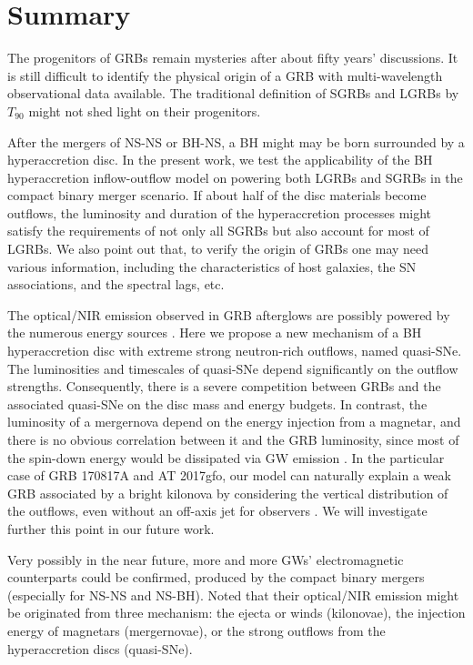 \documentclass[a4paper,fleqn,usenatbib]{mnras}
\begin{document}
\section{Summary}\label{Summary}

The progenitors of GRBs remain mysteries after about fifty years' discussions. It is still difficult to identify the physical origin of a GRB with multi-wavelength observational data available. The traditional definition of SGRBs and LGRBs by $T_{90}$ might not shed light on their progenitors.

After the mergers of NS-NS or BH-NS, a BH might may be born surrounded by a hyperaccretion disc. In the present work, we test the applicability of the BH hyperaccretion inflow-outflow model on powering both LGRBs and SGRBs in the compact binary merger scenario. If about half of the disc materials become outflows, the luminosity and duration of the hyperaccretion processes might satisfy the requirements of not only all SGRBs but also account for most of LGRBs. We also point out that, to verify the origin of GRBs one may need various information, including the characteristics of host galaxies, the SN associations, and the spectral lags, etc.

The optical/NIR emission observed in GRB afterglows are possibly powered by the numerous energy sources \citep[for reviews, see e.g.,][]{Metzger2017}. Here we propose a new mechanism of a BH hyperaccretion disc with extreme strong neutron-rich outflows, named quasi-SNe. The luminosities and timescales of quasi-SNe depend significantly on the outflow strengths. Consequently, there is a severe competition between GRBs and the associated quasi-SNe on the disc mass and energy budgets. In contrast, the luminosity of a mergernova depend on the energy injection from a magnetar, and there is no obvious correlation between it and the GRB luminosity, since most of the spin-down energy would be dissipated via GW emission \citep[e.g.,][]{Liu2017b}. In the particular case of GRB 170817A and AT 2017gfo, our model can naturally explain a weak GRB associated by a bright kilonova by considering the vertical distribution of the outflows, even without an off-axis jet for observers \citep[e.g.,][]{Lazzati2017,Xiao2017,Zhang2017}. We will investigate further this point in our future work.

Very possibly in the near future, more and more GWs' electromagnetic counterparts could be confirmed, produced by the compact binary mergers (especially for NS-NS and NS-BH). Noted that their optical/NIR emission might be originated from three mechanism: the ejecta or winds (kilonovae), the injection energy of magnetars (mergernovae), or the strong outflows from the hyperaccretion discs (quasi-SNe).
\end{document}

